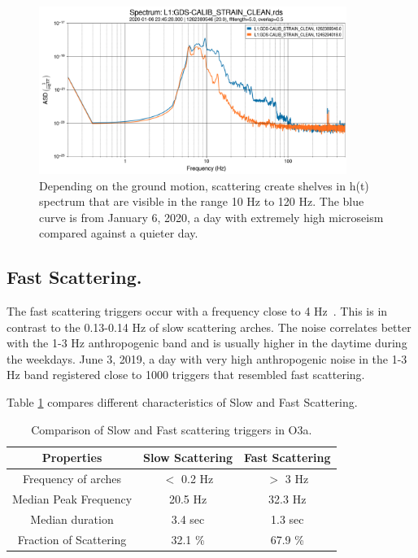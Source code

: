 \documentclass[12pt]{iopart}
\begin{document}
\begin{figure}[h]
    \centering
    \includegraphics[width=10cm]{scatshelf1.png}
    \caption{ Depending on the ground motion, scattering create shelves in h(t) spectrum that are visible in the range 10 Hz to 120 Hz. The blue curve is from January 6, 2020, a day with extremely high microseism compared against a quieter day.}
    \label{fig:scatshelf1}
\end{figure}



\subsection{Fast Scattering.}
The fast scattering triggers occur with a frequency close to 4 Hz~\cite{alogjosh}. This is in contrast to the 0.13-0.14 Hz of slow scattering arches. The noise  correlates better with the 1-3 Hz anthropogenic band and is usually higher in the daytime during the weekdays. June 3, 2019, a day with very high anthropogenic noise in the 1-3 Hz band registered close to 1000 triggers that resembled fast scattering. 


Table \ref{tab:fastslowtab} compares different characteristics of Slow and Fast Scattering.
\begin{table}[h]
    \centering
    \begin{tabular}{c|c|c}
    \hline
      \textbf{Properties}   &  \textbf{Slow Scattering} & 
      \textbf{Fast Scattering}\\
      \hline
       Frequency of arches  & $<$ 0.2 Hz & $>$ 3 Hz \\
      \hline
      Median Peak Frequency & 20.5 Hz & 32.3 Hz \\
      \hline
      Median duration & 3.4 sec & 1.3 sec \\
      \hline
      Fraction of Scattering & 32.1 \% & 67.9 \% \\
       
    \hline
    \end{tabular}
    \caption{Comparison of Slow and Fast scattering triggers in O3a.}
    \label{tab:fastslowtab}
\end{table}{}
\end{document}
